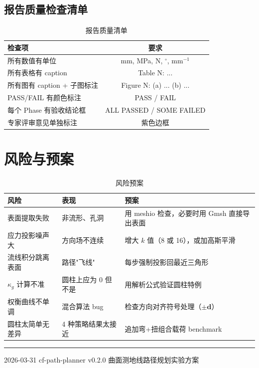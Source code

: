 \documentclass[11pt,a4paper]{article}
\begin{document}
\subsection{报告质量检查清单}

\begin{table}[H]
\centering
\begin{tabularx}{\textwidth}{X c}
\toprule
\textbf{检查项} & \textbf{要求} \\
\midrule
所有数值有单位 & mm, MPa, N, $^\circ$, mm$^{-1}$ \\
所有表格有 caption & Table N: ... \\
所有图有 caption + 子图标注 & Figure N: (a) ... (b) ... \\
PASS/FAIL 有颜色标注 & \textcolor{pass}{PASS} / \textcolor{fail}{FAIL} \\
每个 Phase 有验收结论框 & ALL PASSED / SOME FAILED \\
专家评审意见单独标注 & 紫色边框 \\
\bottomrule
\end{tabularx}
\caption{报告质量清单}
\end{table}


\section{风险与预案}

\begin{table}[H]
\centering
\begin{tabularx}{\textwidth}{l X X}
\toprule
\textbf{风险} & \textbf{表现} & \textbf{预案} \\
\midrule
表面提取失败 & 非流形、孔洞 & 用 meshio 检查，必要时用 Gmsh 直接导出表面 \\
应力投影噪声大 & 方向场不连续 & 增大 $k$ 值（8 或 16），或加高斯平滑 \\
流线积分跳离表面 & 路径"飞线" & 每步强制投影回最近三角形 \\
$\kappa_g$ 计算不准 & 圆柱上应为 0 但不是 & 用解析公式验证圆柱特例 \\
权衡曲线不单调 & 混合算法 bug & 检查方向对齐符号处理（$\pm\mathbf{d}$） \\
圆柱太简单无差异 & 4 种策略结果太接近 & 追加弯+扭组合载荷 benchmark \\
\bottomrule
\end{tabularx}
\caption{风险预案}
\end{table}


\vfill
\noindent\rule{\textwidth}{0.5pt}
{\small 2026-03-31 \quad cf-path-planner v0.2.0 \quad 曲面测地线路径规划实验方案}
\end{document}
